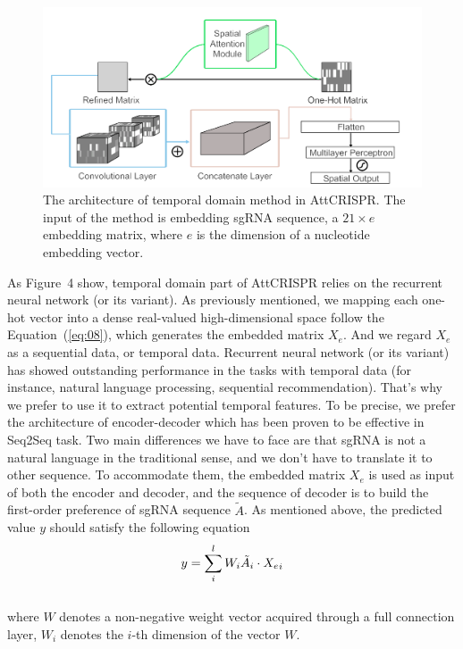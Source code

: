 \documentclass{bioinfo}
\begin{document}
\begin{figure}[!tpb]%
    \centerline{\includegraphics[scale=0.15]{CNNv2.png}}
    \caption{The architecture of temporal domain method in AttCRISPR. 
    The input of the method is embedding sgRNA sequence, a $21\times e$ embedding matrix, where $e$ is the dimension of a nucleotide embedding vector. 
    }\label{fig:04}
\end{figure}
As Figure~4\vphantom{\ref{fig:04}} show, temporal domain part of AttCRISPR relies on the recurrent neural network (or its variant). 
As previously mentioned, we mapping each one-hot vector into a dense real-valued high-dimensional space follow the Equation~(\ref{eq:08}), which generates the embedded matrix $X_e$.
And we regard $X_{e}$ as a sequential data, or temporal data.
Recurrent neural network (or its variant) has showed outstanding performance in the tasks with temporal data (for instance, natural language processing, sequential recommendation). 
That's why we prefer to use it to extract potential temporal features. 
To be precise, we prefer the architecture of encoder-decoder which has been proven to be effective in Seq2Seq task. 
Two main differences we have to face are that sgRNA is not a natural language in the traditional sense, and we don't have to translate it to other sequence. 
To accommodate them, the embedded matrix $X_e$ is used as input of both the encoder and decoder, and the sequence of decoder is to build the first-order preference of sgRNA sequence $\tilde{A}$. 
As mentioned above, the predicted value $y$ should satisfy the following equation
\begin{equation}
y=\sum_i^lW_i\tilde{A}_i\cdot {X_e}_i\label{eq:12}\vspace*{-10pt}
\end{equation}\\
where $W$ denotes a non-negative weight vector acquired through a full connection layer, $W_i$ denotes the $i$-th dimension of the vector $W$. 
\end{document}

